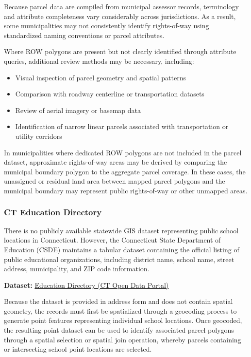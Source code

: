 \documentclass[
  letterpaper,
  DIV=11,
  numbers=noendperiod]{scrreprt}
\providecommand{\tightlist}{%
  \setlength{\itemsep}{0pt}\setlength{\parskip}{0pt}}
\begin{document}
Because parcel data are compiled from municipal assessor records,
terminology and attribute completeness vary considerably across
jurisdictions. As a result, some municipalities may not consistently
identify rights-of-way using standardized naming conventions or parcel
attributes.

Where ROW polygons are present but not clearly identified through
attribute queries, additional review methods may be necessary,
including:

\begin{itemize}
\tightlist
\item
  Visual inspection of parcel geometry and spatial patterns
\item
  Comparison with roadway centerline or transportation datasets
\item
  Review of aerial imagery or basemap data
\item
  Identification of narrow linear parcels associated with transportation
  or utility corridors
\end{itemize}

In municipalities where dedicated ROW polygons are not included in the
parcel dataset, approximate rights-of-way areas may be derived by
comparing the municipal boundary polygon to the aggregate parcel
coverage. In these cases, the unassigned or residual land area between
mapped parcel polygons and the municipal boundary may represent public
rights-of-way or other unmapped areas.

\subsubsection{CT Education Directory}\label{sec-ct-education-directory}

There is no publicly available statewide GIS dataset representing public
school locations in Connecticut. However, the Connecticut State
Department of Education (CSDE) maintains a tabular dataset containing
the official listing of public educational organizations, including
district name, school name, street address, municipality, and ZIP code
information.

\textbf{Dataset:}
\href{https://data.ct.gov/Education/Education-Directory/9k2y-kqxn/about_data}{Education
Directory (CT Open Data Portal)}

Because the dataset is provided in address form and does not contain
spatial geometry, the records must first be spatialized through a
geocoding process to generate point features representing individual
school locations. Once geocoded, the resulting point dataset can be used
to identify associated parcel polygons through a spatial selection or
spatial join operation, whereby parcels containing or intersecting
school point locations are selected.
\end{document}
